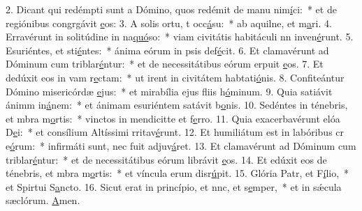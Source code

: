 2. Dicant qui redémpti sunt a Dómino, quos redémit de manu nim\uline{í}ci:~* et de regiónibus congrgávit \uline{e}os:
3. A solis ortu, t occ\uline{á}su:~* ab aquilne, et m\uline{a}ri.
4. Erravérunt in solitúdine in na\uline{quó}so:~* viam civitátis habitáculi nn inven\uline{é}runt.
5. Esuriéntes, et sti\uline{é}ntes:~* ánima eórum in psis def\uline{é}cit.
6. Et clamavérunt ad Dóminum cum triblar\uline{é}ntur:~* et de necessitátibus eórum erpuit \uline{e}os.
7. Et dedúxit eos in vam r\uline{e}ctam:~* ut irent in civitátem habtati\uline{ó}nis.
8. Confiteántur Dómino misericórdæ \uline{e}jus:~* et mirabília ejus fliis h\uline{ó}minum.
9. Quia satiávit ánimm in\uline{á}nem:~* et ánimam esuriéntem satávit b\uline{o}nis.
10. Sedéntes in ténebris, et mbra m\uline{o}rtis:~* vinctos in mendicitte et f\uline{e}rro.
11. Quia exacerbavérunt elóa D\uline{e}i:~* et consílium Altíssimi rritav\uline{é}runt.
12. Et humiliátum est in labóribus cr e\uline{ó}rum:~* infirmáti sunt, nec fuit  adjuv\uline{á}ret.
13. Et clamavérunt ad Dóminum cum triblar\uline{é}ntur:~* et de necessitátibus eórum librávit \uline{e}os.
14. Et edúxit eos de ténebris, et mbra m\uline{o}rtis:~* et víncula erum disr\uline{ú}pit.
15. Glória Patr, et F\uline{í}lio,~* et Spirtui S\uline{a}ncto.
16. Sicut erat in princípio, et nnc, et s\uline{e}mper,~* et in sǽcula sæclórum. \uline{A}men.
